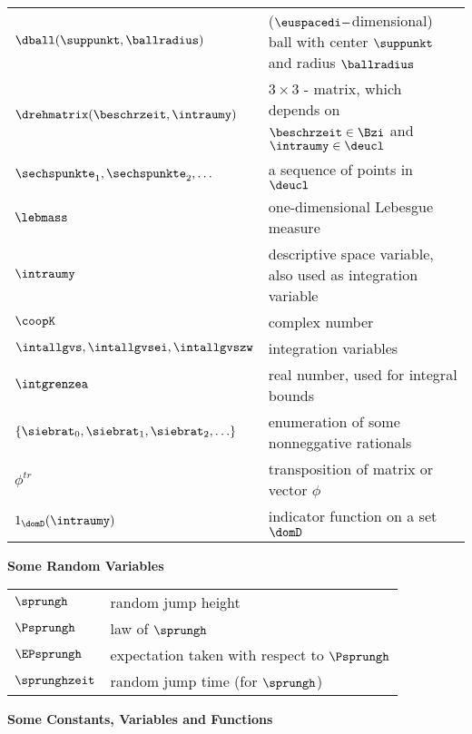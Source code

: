 \begin{longtable}{ll}

${{\dball}({\suppunkt},{\ballradius})}$ & ($\euspacedi-$dimensional) ball with center $\suppunkt$ and radius $\ballradius$
\\
 ${\drehmatrix}({\beschrzeit},{\intraumy})$ &   $3 \times 3$ - matrix, which depends on ${\beschrzeit} \in \Bzi$ and ${\intraumy} \in \deucl$
\\
${\sechspunkte}_{1},{\sechspunkte}_{2},\dots$ & a sequence of points in $\deucl$
\\
$\lebmass$ & one-dimensional Lebesgue measure
\\
$\intraumy$ & descriptive space variable, also used as integration variable
\\
$\coopK$ & complex number 
\\
$\intallgvs,\intallgvsei,\intallgvszw$ & integration variables
\\
$\intgrenzea$ & real number, used for integral bounds
\\
$\{{\siebrat}_0,{\siebrat}_1,{\siebrat}_2,\ldots\}$ & enumeration of some nonneggative rationals
\\
$\phi^{tr} $ & transposition of matrix or vector $\phi$
\\
$1_{\domD}({\intraumy})$ &  indicator function on a set ${\domD}$
\\
 
\end{longtable}


{\large \bf Some Random Variables}


\begin{longtable}{ll}

$\sprungh$ & random jump height 
\\
$\Psprungh$ &  law of $\sprungh$ 
\\
$\EPsprungh$ &  expectation taken with respect to $\Psprungh$ 
\\
$\sprunghzeit$ & random jump time (for $\sprungh$) 
\\
\end{longtable}



{\large \bf   Some Constants, Variables  and Functions}


